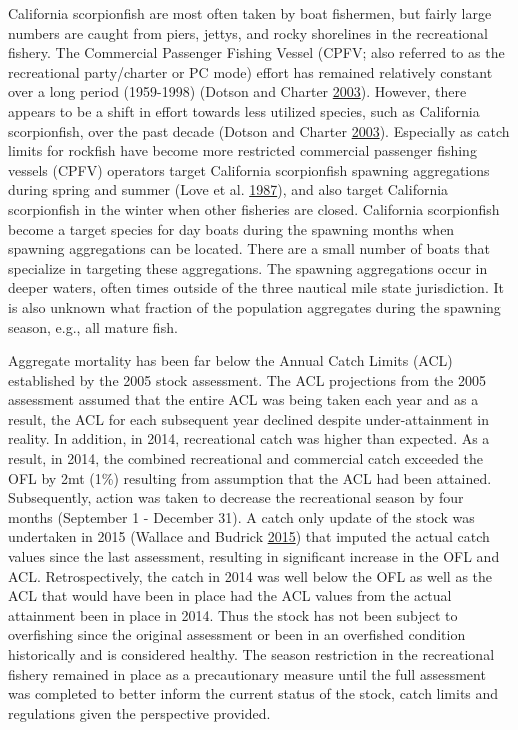 \documentclass[12pt,]{article}
\begin{document}
California scorpionfish are most often taken by boat fishermen, but
fairly large numbers are caught from piers, jettys, and rocky shorelines
in the recreational fishery. The Commercial Passenger Fishing Vessel
(CPFV; also referred to as the recreational party/charter or PC mode)
effort has remained relatively constant over a long period (1959-1998)
(Dotson and Charter \protect\hyperlink{ref-Dotson2003}{2003}). However,
there appears to be a shift in effort towards less utilized species,
such as California scorpionfish, over the past decade (Dotson and
Charter \protect\hyperlink{ref-Dotson2003}{2003}). Especially as catch
limits for rockfish have become more restricted commercial passenger
fishing vessels (CPFV) operators target California scorpionfish spawning
aggregations during spring and summer (Love et al.
\protect\hyperlink{ref-Love1987}{1987}), and also target California
scorpionfish in the winter when other fisheries are closed. California
scorpionfish become a target species for day boats during the spawning
months when spawning aggregations can be located. There are a small
number of boats that specialize in targeting these aggregations. The
spawning aggregations occur in deeper waters, often times outside of the
three nautical mile state jurisdiction. It is also unknown what fraction
of the population aggregates during the spawning season, e.g., all
mature fish.

Aggregate mortality has been far below the Annual Catch Limits (ACL)
established by the 2005 stock assessment. The ACL projections from the
2005 assessment assumed that the entire ACL was being taken each year
and as a result, the ACL for each subsequent year declined despite
under-attainment in reality. In addition, in 2014, recreational catch
was higher than expected. As a result, in 2014, the combined
recreational and commercial catch exceeded the OFL by 2mt (1\%)
resulting from assumption that the ACL had been attained. Subsequently,
action was taken to decrease the recreational season by four months
(September 1 - December 31). A catch only update of the stock was
undertaken in 2015 (Wallace and Budrick
\protect\hyperlink{ref-Wallace2015}{2015}) that imputed the actual catch
values since the last assessment, resulting in significant increase in
the OFL and ACL. Retrospectively, the catch in 2014 was well below the
OFL as well as the ACL that would have been in place had the ACL values
from the actual attainment been in place in 2014. Thus the stock has not
been subject to overfishing since the original assessment or been in an
overfished condition historically and is considered healthy. The season
restriction in the recreational fishery remained in place as a
precautionary measure until the full assessment was completed to better
inform the current status of the stock, catch limits and regulations
given the perspective provided.
\end{document}
